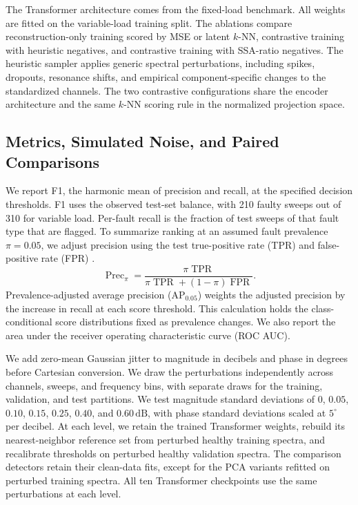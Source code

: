 \documentclass[journal]{IEEEtran}
\newcommand{\AP}{\mathrm{AP}_{0.05}}
\begin{document}
The Transformer architecture comes from the fixed-load benchmark. All weights are fitted on the variable-load training split. The ablations compare reconstruction-only training scored by MSE or latent $k$-NN, contrastive training with heuristic negatives, and contrastive training with SSA-ratio negatives. The heuristic sampler applies generic spectral perturbations, including spikes, dropouts, resonance shifts, and empirical component-specific changes to the standardized channels. The two contrastive configurations share the encoder architecture and the same $k$-NN scoring rule in the normalized projection space.

\subsection{Metrics, Simulated Noise, and Paired Comparisons}\label{sec:5_3}

We report F1, the harmonic mean of precision and recall, at the specified decision thresholds. F1 uses the observed test-set balance, with 210 faulty sweeps out of 310 for variable load. Per-fault recall is the fraction of test sweeps of that fault type that are flagged. To summarize ranking at an assumed fault prevalence $\pi=0.05$, we adjust precision using the test true-positive rate (TPR) and false-positive rate (FPR) \cite{davis2006relationship,saito2015precision}.
\begin{equation}
\label{eq:prec_pi}
\operatorname{Prec}_{\pi} =
\frac{\pi\operatorname{TPR}}
{\pi\operatorname{TPR}+(1-\pi)\operatorname{FPR}}.
\end{equation}
Prevalence-adjusted average precision ($\AP$) weights the adjusted precision by the increase in recall at each score threshold. This calculation holds the class-conditional score distributions fixed as prevalence changes. We also report the area under the receiver operating characteristic curve (ROC AUC).

We add zero-mean Gaussian jitter to magnitude in decibels and phase in degrees before Cartesian conversion. We draw the perturbations independently across channels, sweeps, and frequency bins, with separate draws for the training, validation, and test partitions. We test magnitude standard deviations of $0$, $0.05$, $0.10$, $0.15$, $0.25$, $0.40$, and $0.60\,\mathrm{dB}$, with phase standard deviations scaled at $5^\circ$ per decibel. At each level, we retain the trained Transformer weights, rebuild its nearest-neighbor reference set from perturbed healthy training spectra, and recalibrate thresholds on perturbed healthy validation spectra. The comparison detectors retain their clean-data fits, except for the PCA variants refitted on perturbed training spectra. All ten Transformer checkpoints use the same perturbations at each level.
\end{document}
